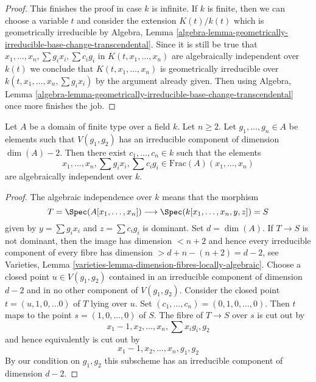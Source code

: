 \begin{proof}
\medskip\noindent
This finishes the proof in case $k$ is infinite. If $k$ is finite,
then we can choose a variable $t$ and consider the extension
$K(t)/k(t)$ which is geometrically irreducible by
Algebra, Lemma
\ref{algebra-lemma-geometrically-irreducible-base-change-transcendental}.
Since it is still be true that
$x_1, \ldots, x_n, \sum g_ix_i, \sum c_ig_i$
in $K(t, x_1, \ldots, x_n)$ are algebraically independent over $k(t)$
we conclude that $K(t, x_1, \ldots, x_n)$
is geometrically irreducible over
$k(t, x_1, \ldots, x_n, \sum g_ix_i)$
by the argument already given.
Then using Algebra, Lemma
\ref{algebra-lemma-geometrically-irreducible-base-change-transcendental}
once more finishes the job.
\end{proof}

\begin{lemma}
\label{lemma-algebraically-independent}
Let $A$ be a domain of finite type over a field $k$. Let $n \geq 2$.
Let $g_1, \ldots, g_n \in A$ be elements such that $V(g_1, g_2)$
has an irreducible component of dimension $\dim(A) - 2$.
Then there exist $c_1, \ldots, c_n \in k$ such that the elements
$$
x_1, \ldots, x_n, \sum g_ix_i, \sum c_ig_i \in
\text{Frac}(A)(x_1, \ldots, x_n)
$$
are algebraically independent over $k$.
\end{lemma}

\begin{proof}
The algebraic independence over $k$ means that the morphism
$$
T = \Spec(A[x_1, \ldots, x_n])
\longrightarrow
\Spec(k[x_1, \ldots, x_n, y, z]) = S
$$
given by $y = \sum g_ix_i$ and $z = \sum c_ig_i$ is dominant.
Set $d = \dim(A)$. If $T \to S$ is not dominant, then the image
has dimension $< n + 2$ and hence every irreducible component
of every fibre has dimension $> d + n - (n + 2) = d - 2$, see
Varieties, Lemma
\ref{varieties-lemma-dimension-fibres-locally-algebraic}.
Choose a closed point $u \in V(g_1, g_2)$ contained in an irreducible component
of dimension $d - 2$ and in no other component of $V(g_1, g_2)$.
Consider the closed point $t = (u, 1, 0, \ldots 0)$
of $T$ lying over $u$. Set $(c_1, \ldots, c_n) = (0, 1, 0, \ldots, 0)$.
Then $t$ maps to the point $s = (1, 0, \ldots, 0)$ of $S$.
The fibre of $T \to S$ over $s$ is cut out by
$$
x_1 - 1, x_2, \ldots, x_n, \sum x_ig_i, g_2
$$
and hence equivalently is cut out by
$$
x_1 - 1, x_2, \ldots, x_n, g_1, g_2
$$
By our condition on $g_1, g_2$ this subscheme has an irreducible component
of dimension $d - 2$.
\end{proof}

